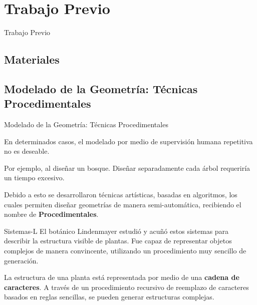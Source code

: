 \documentclass[spanish]{beamer}
\begin{document}
\section{Trabajo Previo}

\begin{frame}
\begin{block}{}
\begin{center}
\vspace{1cm}
\huge{Trabajo Previo}
\vspace{1cm}
\end{center}
\end{block}
\end{frame}

\subsection{Materiales}


\subsection{Modelado de la Geometría: Técnicas Procedimentales}
\begin{frame}{Modelado de la Geometría: Técnicas Procedimentales}

En determinados casos, el modelado por medio de supervisión humana repetitiva no es deseable.

\vspace{0.5cm}
Por ejemplo, al diseñar un bosque. Diseñar separadamente cada árbol requeriría un tiempo excesivo.

\vspace{0.5cm}
Debido a esto se desarrollaron técnicas artísticas, basadas en algoritmos, los cuales permiten diseñar geometrías de manera semi-automática, recibiendo el nombre de \textbf{Procedimentales}.

\end{frame}

\begin{frame}{Sistemas-L}
El botánico Lindenmayer estudió y acuñó estos sistemas para describir la estructura visible de plantas. Fue capaz de representar objetos complejos de manera convincente, utilizando un procedimiento muy sencillo de generación.

La estructura de una planta está representada por medio de una \textbf{cadena de caracteres}.
A través de un procedimiento recursivo de reemplazo de caracteres basados en reglas sencillas, se pueden generar estructuras complejas.

\end{frame}
\end{document}
